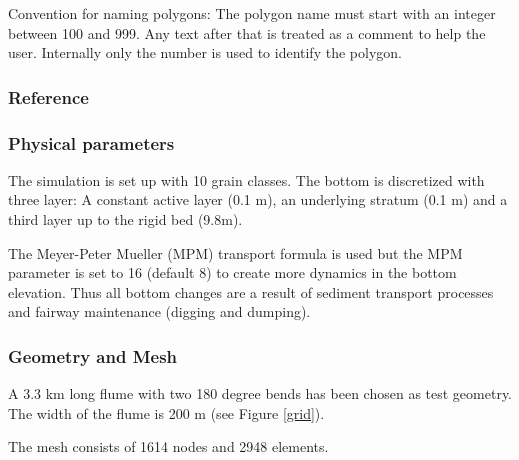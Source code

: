 Convention for naming polygons: The polygon name must start with an integer between 100 and 999. Any text after that is treated as a comment to  help the user. 
Internally only the number is used to identify the polygon. 


%
%
\subsubsection{Reference}
%

%
%
\subsubsection{Physical parameters}
%
The simulation is set up with 10 grain classes. 
The bottom is discretized with three layer: A constant active layer (0.1 m), an underlying stratum (0.1 m) and a third layer up to the rigid bed (9.8m).  

The Meyer-Peter Mueller (MPM) transport formula is used but the MPM parameter is set to 16 (default 8) to create more dynamics in the bottom elevation. Thus all bottom changes are a result of sediment transport processes and fairway maintenance (digging and dumping).  
%
%
\subsubsection{Geometry and Mesh}
%
A 3.3 km long flume with two 180 degree bends has been chosen as test geometry.
The width of the flume is 200 m  (see Figure \ref{grid}). 

The mesh consists of 1614 nodes and 2948 elements.

